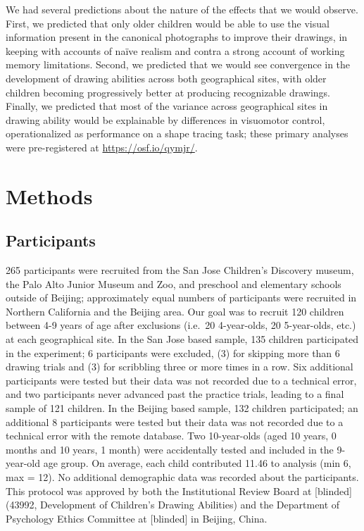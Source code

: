 \documentclass[
  english,
  man]{apa6}
\begin{document}
We had several predictions about the nature of the effects that we would observe. First, we predicted that only older children would be able to use the visual information present in the canonical photographs to improve their drawings, in keeping with accounts of naïve realism and contra a strong account of working memory limitations.
Second, we predicted that we would see convergence in the development of drawing abilities across both geographical sites, with older children becoming progressively better at producing recognizable drawings.
Finally, we predicted that most of the variance across geographical sites in drawing ability would be explainable by differences in visuomotor control, operationalized as performance on a shape tracing task; these primary analyses were pre-registered at \url{https://osf.io/qymjr/}.

\hypertarget{methods}{%
\section{Methods}\label{methods}}

\hypertarget{participants}{%
\subsection{Participants}\label{participants}}

265 participants were recruited from the San Jose Children's Discovery museum, the Palo Alto Junior Museum and Zoo, and preschool and elementary schools outside of Beijing; approximately equal numbers of participants were recruited in Northern California and the Beijing area. Our goal was to recruit 120 children between 4-9 years of age after exclusions (i.e.~20 4-year-olds, 20 5-year-olds, etc.) at each geographical site. In the San Jose based sample, 135 children participated in the experiment; 6 participants were excluded, (3) for skipping more than 6 drawing trials and (3) for scribbling three or more times in a row. Six additional participants were tested but their data was not recorded due to a technical error, and two participants never advanced past the practice trials, leading to a final sample of 121 children. In the Beijing based sample, 132 children participated; an additional 8 participants were tested but their data was not recorded due to a technical error with the remote database. Two 10-year-olds (aged 10 years, 0 months and 10 years, 1 month) were accidentally tested and included in the 9-year-old age group. On average, each child contributed 11.46 to analysis (min 6, max = 12). No additional demographic data was recorded about the participants. This protocol was approved by both the Institutional Review Board at {[}blinded{]} (43992, Development of Children's Drawing Abilities) and the Department of Psychology Ethics Committee at {[}blinded{]} in Beijing, China.
\end{document}
